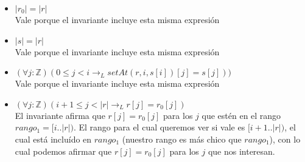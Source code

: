 \documentclass{article}
\begin{document}
\begin{enumerate}[label=\alph*)]
\begin{itemize}
	\item $|r_0|=|r|$\\
	Vale porque el invariante incluye esta misma expresión
	\item $|s|=|r|$\\
	Vale porque el invariante incluye esta misma expresión
	\item $(\forall j:\mathbb{Z})(0\leq j<i \rightarrow_L setAt(r,i,s[i])[j]=s[j]))$\\
	Vale porque el invariante incluye esta misma expresión
	\item $(\forall j:\mathbb{Z})(i+1\leq j<|r|\rightarrow_L r[j]=r_0[j])$\\
	El invariante afirma que $r[j]=r_0[j]$ para los $j$ que estén en el rango $rango_1=[i..|r|)$. El rango para el cual queremos 
	ver si vale es $[i+1..|r|)$, el cual está incluído en $rango_1$ (nuestro rango es más chico que $rango_1$), con lo cual podemos
	afirmar que $r[j]=r_0[j]$ para los $j $ que nos interesan.
	\end{itemize}
\end{enumerate}
\end{document}
